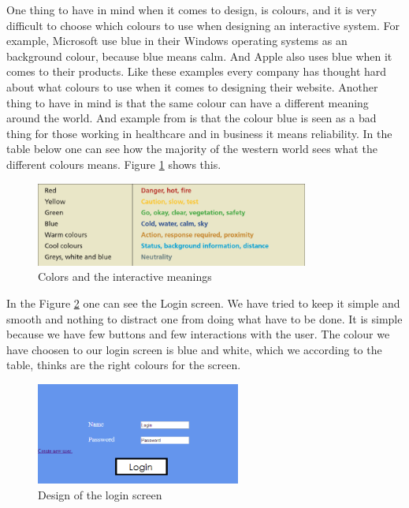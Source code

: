 One thing to have in mind when it comes to design, is colours, and it is very difficult to choose which colours to use when designing an interactive system. For example, Microsoft use blue in their Windows operating systems as an background colour, because blue means calm. And Apple also uses blue when it comes to their products. Like these examples every company has thought hard about what colours to use when it comes to designing their website. 
Another thing to have in mind is that the same colour can have a different meaning around the world. And example from \cite{DEBBook} is that the colour blue is seen as a bad thing for those working in healthcare and in business it means reliability.
In the table below one can see how the majority of the western world sees what the different colours means. Figure \ref{Colors} shows this.

\begin{figure}[htb]
\centering
\includegraphics[width=0.8\textwidth]{Images/Colors.png}
\caption{Colors and the interactive meanings}
\label{Colors}
\end{figure}

In the Figure \ref{Login} one can see the Login screen. We have tried to keep it simple and smooth and nothing to distract one from doing what have to be done. It is simple because we have few buttons and few interactions with the user. The colour we have choosen to our login screen is blue and white, which we according to the table, thinks are the right colours for the screen.

\begin{figure}[htb]
\centering
\includegraphics[width=0.6\textwidth]{Images/Login.png}
\caption{Design of the login screen}
\label{Login}
\end{figure}

